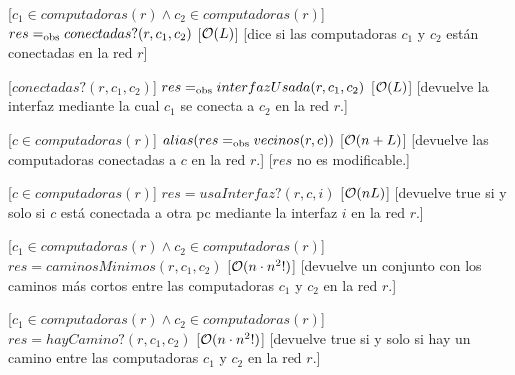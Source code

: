 \begin{Interfaz}
  [$c_1 \in computadoras(r) \land c_2 \in computadoras(r)$]
  {$res =_{\mathrm{obs}} conectadas?(r,c_1,c_2)$}
  [$\mathcal{O}(L)$]
  [dice si las computadoras $c_1$ y $c_2$ están conectadas en la red $r$]


  [$conectadas?(r,c_1,c_2)$]
  {$res =_{\mathrm{obs}} interfazUsada(r,c_1,c_2)$}
  [$\mathcal{O}(L)$]
  [devuelve la interfaz mediante la cual $c_1$ se conecta a $c_2$  en la red $r$.]

	\newpage
  [$c \in computadoras(r)$]
  {$alias(res =_{\mathrm{obs}} vecinos(r,c))$}
  [$\mathcal{O}(n+L)$]
  [devuelve las computadoras conectadas a $c$ en la red $r$.]
  [$res$ no es modificable.]


  [$c \in computadoras(r)$]
  {$res = usaInterfaz?(r,c,i)$}
  [$\mathcal{O}(nL)$]
  [devuelve true si y solo si $c$ está conectada a otra pc mediante la interfaz $i$ en la red $r$.]


  [$c_1 \in computadoras(r) \land c_2 \in computadoras(r)$]
  {$res = caminosMinimos(r,c_1,c_2)$}
  [$\mathcal{O}(n \cdot n^2!)$]
  [devuelve un conjunto con los caminos más cortos entre las computadoras $c_1$ y $c_2$ en la red $r$.]


  [$c_1 \in computadoras(r) \land c_2 \in computadoras(r)$]
  {$res = hayCamino?(r,c_1,c_2)$} 
  [$\mathcal{O}(n \cdot n^2!)$]
  [devuelve true si y solo si hay un camino entre las computadoras $c_1$ y $c_2$ en la red $r$.]



\end{Interfaz}

